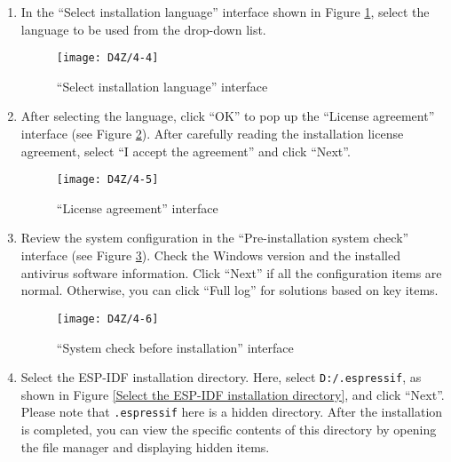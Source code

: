 \documentclass[a4paper,12pt]{book}
\begin{document}
\begin{enumerate}[label=(\arabic*)]
    \item In the “Select installation language” interface shown in Figure \ref{“Select installation language” interface}, select the language to be used from the drop-down list.

    \begin{figure}[h!]
        \centering
        \texttt{[image: D4Z/4-4]}
        \caption{“Select installation language” interface}
        \label{“Select installation language” interface}
    \end{figure}

    \item After selecting the language, click “OK” to pop up the “License agreement” interface (see Figure \ref{“License agreement” interface}). After carefully reading the installation license agreement, select “I accept the agreement” and click “Next”.

    \begin{figure}[h!]
        \centering
        \texttt{[image: D4Z/4-5]}
        \caption{“License agreement” interface}
        \label{“License agreement” interface}
    \end{figure}

    \item Review the system configuration in the “Pre-installation system check” interface (see Figure \ref{“System check before installation” interface}). Check the Windows version and the installed antivirus software information. Click “Next” if all the configuration items are normal. Otherwise, you can click “Full log” for solutions based on key items.

    \begin{figure}[h!]
        \centering
        \texttt{[image: D4Z/4-6]}
        \caption{“System check before installation” interface}
        \label{“System check before installation” interface}
    \end{figure}


    \item Select the ESP-IDF installation directory. Here, select \verb|D:/.espressif|, as shown in Figure \ref{Select the ESP-IDF installation directory}, and click “Next”. Please note that \verb|.espressif| here is a hidden directory. After the installation is completed, you can view the specific contents of this directory by opening the file manager and displaying hidden items.


\end{enumerate}
\end{document}
